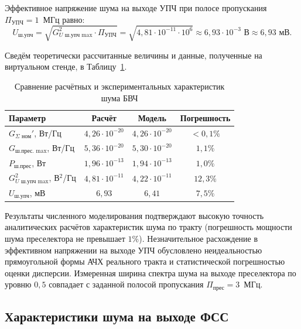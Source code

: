 Эффективное напряжение шума на выходе УПЧ при полосе пропускания $\Pi_{\text{УПЧ}} = 1$~МГц равно:
\begin{equation}
    U_{\text{ш.упч}} = \sqrt{G_{U\text{ ш.упч max}}^2 \cdot \Pi_{\text{УПЧ}}} = \sqrt{4{,}81 \cdot 10^{-11} \cdot 10^6} \approx 6{,}93 \cdot 10^{-3}\text{ В} \approx 6{,}93\text{ мВ}.
\end{equation}

Сведём теоретически рассчитанные величины и данные, полученные на виртуальном стенде, в Таблицу~\ref{tab:comparison_bvch}.

\begin{table}[H]
\centering
\caption{Сравнение расчётных и экспериментальных характеристик шума БВЧ}
\label{tab:comparison_bvch}
\begin{tabular}{|l|c|c|c|}
\hline
\textbf{Параметр} & \textbf{Расчёт} & \textbf{Модель} & \textbf{Погрешность} \\ \hline
$G_{\Sigma\text{ ном}}'$, Вт/Гц & $4{,}26 \cdot 10^{-20}$ & $4{,}26 \cdot 10^{-20}$ & $< 0{,}1\%$ \\ \hline
$G_{\text{ш.прес. max}}$, Вт/Гц & $5{,}36 \cdot 10^{-20}$ & $5{,}30 \cdot 10^{-20}$ & $1{,}1\%$ \\ \hline
$P_{\text{ш.прес}}$, Вт & $1{,}96 \cdot 10^{-13}$ & $1{,}94 \cdot 10^{-13}$ & $1{,}0\%$ \\ \hline
$G_{U\text{ ш.упч max}}^2$, В$^2$/Гц & $4{,}81 \cdot 10^{-11}$ & $4{,}22 \cdot 10^{-11}$ & $12{,}3\%$ \\ \hline
$U_{\text{ш.упч}}$, мВ & $6{,}93$ & $6{,}41$ & $7{,}5\%$ \\ \hline
\end{tabular}
\end{table}

Результаты численного моделирования подтверждают высокую точность аналитических расчётов характеристик шума по тракту (погрешность мощности шума преселектора не превышает $1\%$). Незначительное расхождение в эффективном напряжении на выходе УПЧ обусловлено неидеальностью прямоугольной формы АЧХ реального тракта и статистической погрешностью оценки дисперсии. Измеренная ширина спектра шума на выходе преселектора по уровню $0{,}5$ совпадает с заданной полосой пропускания $\Pi_{\text{прес}} = 3$~МГц.

\subsection{Характеристики шума на выходе ФСС}

